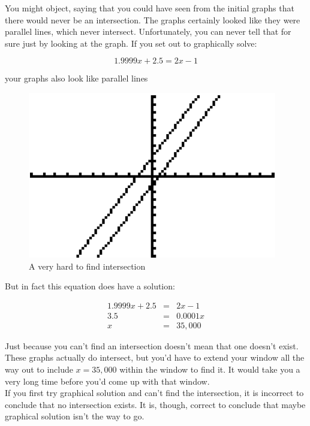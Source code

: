 You might object, saying that you could have seen from the initial graphs that there would never be an intersection. The graphs certainly looked like they were parallel lines, which never intersect.  Unfortunately, you can never tell that for sure just by looking at the graph. If you set out to graphically solve:

\begin{equation*}
	1.9999x+2.5=2x-1
\end{equation*}

your graphs also look like parallel lines

\begin{figure}[H]
	\centering
	\includegraphics[scale=1.0]{Sections/SolvingEquationsGraphically/Figure26.png}
	\caption{A very hard to find intersection}
\end{figure}

But in fact this equation does have a solution:

\begin{equation*}
	\begin{array}{rcl}
		1.9999x+2.5&=&2x-1\\
		3.5&=&0.0001x\\
		x&=&35,000
	\end{array}
\end{equation*}

Just because you can’t find an intersection doesn’t mean that one doesn’t exist. These graphs actually do intersect, but you’d have to extend your window all the way out to include $x=35,000$ within the window to find it. It would take you a very long time before you’d come up with that window.\\

If you first try graphical solution and can’t find the intersection, it is incorrect to conclude that no intersection exists. It is, though, correct to conclude that maybe graphical solution isn’t the way to go.\\

